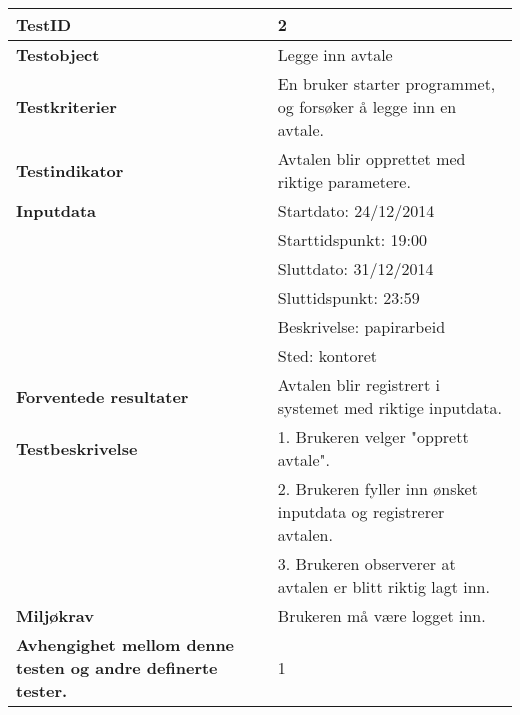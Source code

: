 	\begin{tabularx}{1.2\textwidth}{| p{5cm} | X |}
	\hline
	\textbf{TestID} 																& 2																	\\ \hline
	\textbf{Testobject} 															& Legge inn avtale														\\ \hline
	\textbf{Testkriterier} 															& En bruker starter programmet, og forsøker å legge inn en avtale.						\\ \hline
	\textbf{Testindikator} 															& Avtalen blir opprettet med riktige parametere.									\\ \hline
	\textbf{Inputdata} 															& Startdato: 24/12/2014													\\
																			& Starttidspunkt: 19:00													\\
																			& Sluttdato: 31/12/2014													\\
																			& Sluttidspunkt: 23:59														\\
																			& Beskrivelse: papirarbeid													\\
																			& Sted: kontoret															\\  \hline
	\textbf{Forventede resultater}									 				& Avtalen blir registrert i systemet med riktige inputdata.							\\ \hline
	\textbf{Testbeskrivelse} 														& 1. Brukeren velger "opprett avtale".											\\
																			& 2. Brukeren fyller inn ønsket inputdata og registrerer avtalen.						\\
																			& 3. Brukeren observerer at avtalen er blitt riktig lagt inn.							\\ \hline
	\textbf{Miljøkrav}			 												& Brukeren må være logget inn.				\\ \hline
	\textbf{Avhengighet mellom denne testen og andre definerte tester.}		 				&1				 													\\ \hline
	\end{tabularx}

\mbox{}\\

